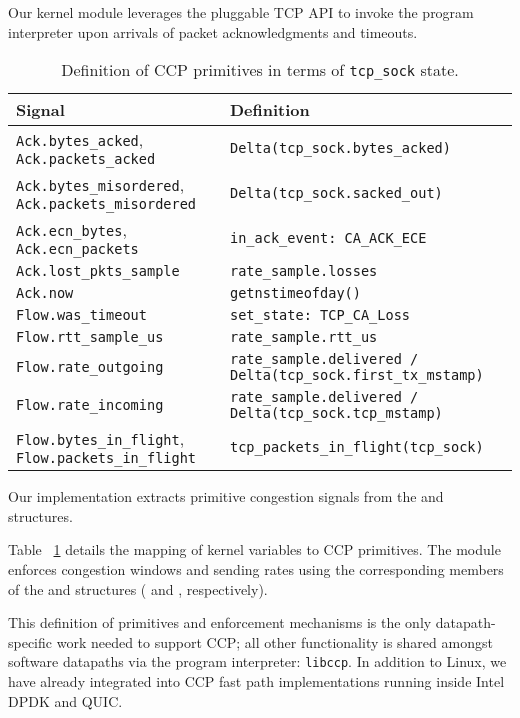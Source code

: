 Our kernel module leverages the pluggable TCP API to invoke the program
interpreter upon arrivals of packet acknowledgments and timeouts.
%
\begin{table}
    \centering
    \footnotesize
    \begin{tabular}{p{}p{}}
        \textbf{Signal} & \textbf{Definition} \\
        \hline
        \texttt{Ack.bytes\_acked}, \texttt{Ack.packets\_acked}             & \texttt{Delta(tcp\_sock.bytes\_acked)} \\
        \texttt{Ack.bytes\_misordered}, \texttt{Ack.packets\_misordered}   & \texttt{Delta(tcp\_sock.sacked\_out)} \\
        \texttt{Ack.ecn\_bytes}, \texttt{Ack.ecn\_packets}                 & \texttt{in\_ack\_event: CA\_ACK\_ECE} \\
        \texttt{Ack.lost\_pkts\_sample}                                    & \texttt{rate\_sample.losses} \\
        \texttt{Ack.now}                                                   & \texttt{getnstimeofday()}\\
        \texttt{Flow.was\_timeout}                                         & \texttt{set\_state: TCP\_CA\_Loss} \\
        \texttt{Flow.rtt\_sample\_us}                                      & \texttt{rate\_sample.rtt\_us} \\
        \texttt{Flow.rate\_outgoing}                                       & \texttt{rate\_sample.delivered / Delta(tcp\_sock.first\_tx\_mstamp)} \\
        \texttt{Flow.rate\_incoming}                                       & \texttt{rate\_sample.delivered / Delta(tcp\_sock.tcp\_mstamp)}  \\
        \texttt{Flow.bytes\_in\_flight}, \texttt{Flow.packets\_in\_flight} & \texttt{tcp\_packets\_in\_flight(tcp\_sock)} \\
    \end{tabular}
    \caption{Definition of CCP primitives in terms of \texttt{tcp\_sock} state.}\label{tab:api:kernel}
\end{table}
Our implementation extracts primitive congestion signals from the
 and  structures.

Table ~\ref{tab:api:kernel} details the mapping of kernel variables
to CCP primitives.
%
The module enforces congestion windows and sending rates using the corresponding
members of the  and  structures ( and
, respectively).

This definition of primitives and enforcement mechanisms is the only datapath-specific
work needed to support CCP; all other functionality is shared amongst software datapaths
via the program interpreter: \texttt{libccp}. In addition to Linux, we have already integrated
 into CCP fast path implementations running inside Intel DPDK and
QUIC.
